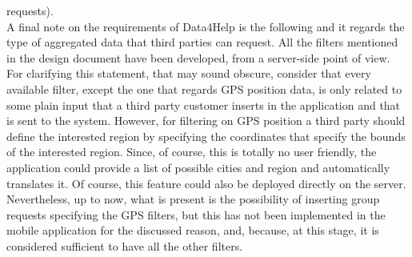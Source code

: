 requests). \\
A final note on the requirements of Data4Help is the following and it regards the type of aggregated data that third parties can request.  
All the filters mentioned in the design document have been developed, from a server-side point of view. 
For clarifying this statement, that may sound obscure, consider that every available filter, except the one that regards GPS position data, is
only related to some plain input that a third party customer inserts in the application and that is sent to the system.
However, for filtering on GPS position a third party should define the interested region by specifying the coordinates that specify the bounds
of the interested region. 
Since, of course, this is totally no user friendly, the application could provide a list of possible cities and region and automatically
translates it. Of course, this feature could also be deployed directly on the server. \\
Nevertheless, up to now, what is present is the possibility of inserting group requests specifying the GPS filters, but this has not been 
implemented in the mobile application for the discussed reason, and, because, at this stage, it is considered sufficient to have all the 
other filters. 

